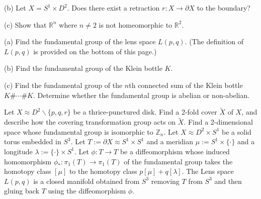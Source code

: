 \documentclass[14pt]{extarticle}
\begin{document}
(b) Let $X=S^{1} \times D^{2}$. Does there exist a retraction $r: X \rightarrow \partial X$ to the boundary?

(c) Show that $\mathbb{R}^{n}$ where $n \neq 2$ is not homeomorphic to $\mathbb{R}^{2}$.

\newpage
(a) Find the fundamental group of the lens space $L(p, q)$. (The definition of $L(p, q)$ is provided on the bottom of this page.)

(b) Find the fundamental group of the Klein bottle $K$.

(c) Find the fundamental group of the $n$th connected sum of the Klein bottle $K \# \cdots \# K$. Determine whether the fundamental group is abelian or non-abelian.

\newpage
Let $X \approx D^{2} \backslash\{p, q, r\}$ be a thrice-punctured disk. Find a 2-fold cover $\tilde{X}$ of $X$, and describe how the covering transformation group acts on $\tilde{X}$.
\newpage
Find a 2-dimensional space whose fundamental group is isomorphic to $\mathbb{Z}_{n}$.
\newpage
Let $X \approx D^{2} \times S^{1}$ be a solid torus embedded in $S^{3}$. Let $T:=\partial X \approx S^{1} \times S^{1}$ and a meridian $\mu:=S^{1} \times\{\cdot\}$ and a longitude $\lambda:=\{\cdot\} \times S^{1}$. Let $\phi: T \rightarrow T$ be a diffeomorphism whose induced homomorphism $\phi_{*}: \pi_{1}(T) \rightarrow \pi_{1}(T)$ of the fundamental group takes the homotopy class $[\mu]$ to the homotopy class $p[\mu]+q[\lambda]$. The Lens space $L(p, q)$ is a closed manifold obtained from $S^{3}$ removing $T$ from $S^{3}$ and then gluing back $T$ using the diffeomorphism $\phi$.
\end{document}
